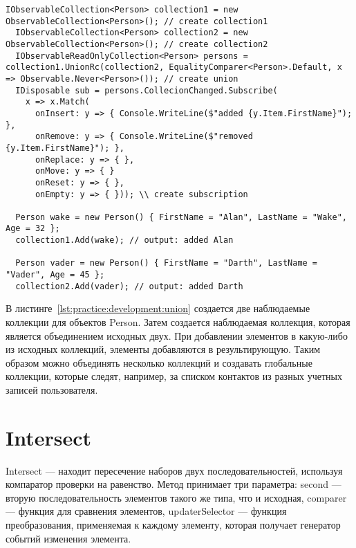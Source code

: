 \begin{lstlisting}[style=csharpinlinestyle, caption={Пример использования Union}, label=lst:practice:development:union]
  IObservableCollection<Person> collection1 = new ObservableCollection<Person>(); // create collection1
  IObservableCollection<Person> collection2 = new ObservableCollection<Person>(); // create collection2
  IObservableReadOnlyCollection<Person> persons = collection1.UnionRc(collection2, EqualityComparer<Person>.Default, x => Observable.Never<Person>()); // create union
  IDisposable sub = persons.CollecionChanged.Subscribe(
    x => x.Match(
      onInsert: y => { Console.WriteLine($"added {y.Item.FirstName}"); },
      onRemove: y => { Console.WriteLine($"removed {y.Item.FirstName}"); },
      onReplace: y => { },
      onMove: y => { }
      onReset: y => { },
      onEmpty: y => { })); \\ create subscription

  Person wake = new Person() { FirstName = "Alan", LastName = "Wake", Age = 32 };
  collection1.Add(wake); // output: added Alan

  Person vader = new Person() { FirstName = "Darth", LastName = "Vader", Age = 45 };
  collection2.Add(vader); // output: added Darth
\end{lstlisting}

В листинге~\ref{lst:practice:development:union} создается две наблюдаемые коллекции для объектов Person. Затем создается наблюдаемая коллекция, которая является объединением исходных двух.
При добавлении элементов в какую-либо из исходных коллекций, элементы добавляются в результирующую. Таким образом можно объединять несколько коллекций и создавать глобальные коллекции,
которые следят, например, за списком контактов из разных учетных записей пользователя.

\section{Intersect}
\label{sub:development:intersect}

Intersect --- находит пересечение наборов двух последовательностей, используя компаратор проверки на равенство.
Метод принимает три параметра: second --- вторую последовательность элементов такого же типа, что и исходная,
comparer --- функция для сравнения элементов, updaterSelector --- функция преобразования, применяемая к каждому элементу, которая получает генератор событий изменения элемента.

